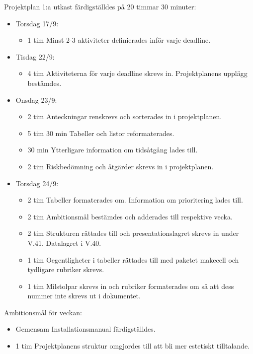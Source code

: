 \documentclass{TDP003mall}
\begin{document}
  Projektplan 1:a utkast färdigställdes på 20 timmar 30 minuter:
\begin{itemize}
  \item Torsdag 17/9:
  \begin{itemize}
    \item 1 tim Minst 2-3 aktiviteter definierades inför varje deadline.
  \end{itemize}
  \item Tisdag 22/9:
  \begin{itemize}
    \item 4 tim Aktiviteterna för varje deadline skrevs in. Projektplanens upplägg bestämdes.
  \end{itemize}
  \item Onsdag 23/9:
  \begin{itemize}
    \item 2 tim Anteckningar renskrevs och sorterades in i projektplanen.
    \item 5 tim 30 min Tabeller och listor reformaterades.
    \item 30 min Ytterligare information om tidsåtgång lades till.
    \item 2 tim Riskbedömning och åtgärder skrevs in i projektplanen.
  \end{itemize}
  \item Torsdag 24/9:
  \begin{itemize}
    \item 2 tim Tabeller formaterades om. Information om prioritering lades till.
    \item 2 tim Ambitionsmål bestämdes och adderades till respektive vecka.
    \item 2 tim Strukturen rättades till och presentationslagret skrevs in under V.41. Datalagret i V.40.
    \item 1 tim Oegentligheter i tabeller rättades till med paketet makecell och tydligare rubriker skrevs.
    \item 1 tim Milstolpar skrevs in och rubriker formaterades om så att dess nummer inte skrevs ut i dokumentet.
  \end{itemize}
\end{itemize}

Ambitionsmål för veckan:
\begin{itemize}
\item Gemensam Installationsmanual färdigställdes.
  \item 1 tim Projektplanens struktur omgjordes till att bli mer estetiskt tilltalande.
  \end{itemize}
\end{document}
